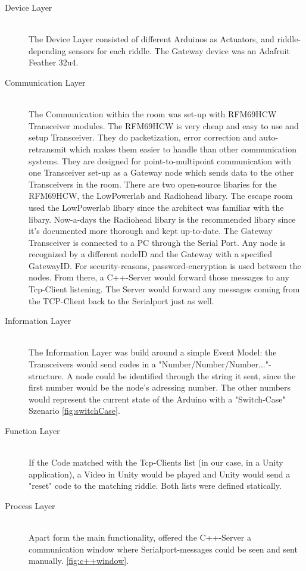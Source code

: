 \begin{description}
	\item[Device Layer]\hfill \\
	      The Device Layer consisted of different Arduinos as Actuators, and riddle-depending sensors for each riddle.
	      The Gateway device was an Adafruit Feather 32u4.
	\item[Communication Layer]\hfill \\
	      The Communication within the room was set-up with RFM69HCW Transceiver modules.\parencite{radiorange}
	      The RFM69HCW is very cheap and easy to use and setup Transceiver. They do packetization, error correction and auto-retransmit which makes them easier to handle than other communication systems.
	      They are designed for point-to-multipoint communication with one Transceiver set-up as a Gateway node which sends data to the other Transceivers in the room.
	      There are two open-source libaries for the RFM69HCW, the LowPowerlab \parencite{LowPowerlab} and Radiohead \parencite{Radiohead} libary.
	      The escape room used the LowPowerlab libary since the architect was familiar with the libary.
          Now-a-days the Radiohead libary is the recommended libary since it's documented more thorough and kept up-to-date.
          The Gateway Transceiver is connected to a PC through the Serial Port. Any node is recognized by a different nodeID and the Gateway with a specified GatewayID. For security-reasons, password-encryption is used between the nodes. 
          From there, a C++-Server would forward those messages to any Tcp-Client listening.    
          The Server would forward any messages coming from the TCP-Client back to the Serialport just as well.
	\item[Information Layer]\hfill \\
        The Information Layer was build around a simple Event Model: the Transceivers would send codes in a "Number/Number/Number..."-structure. 
        A node could be identified through the string it sent, since the first number would be the node's adressing number. 
        The other numbers would represent the current state of the Arduino with a "Switch-Case" Szenario \ref{fig:switchCase}. 
	\item[Function Layer]\hfill \\
        If the Code matched with the Tcp-Clients list (in our case, in a Unity application), a Video in Unity would be played and Unity would send a "reset" code to the matching riddle. 
        Both lists were defined statically.
	\item[Process Layer]\hfill \\
	Apart form the main functionality, offered the C++-Server a communication window where Serialport-messages 
    could be seen and sent manually. \ref{fig:c++window}.

\end{description}
